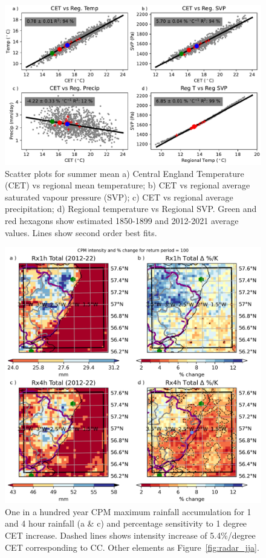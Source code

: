 \documentclass[11pt,a4paper]{article}
\begin{document}
\begin{figure}
	\centering
	\includegraphics[width=\linewidth]{scatter}
	\caption{Scatter plots for summer mean  a)  Central England Temperature (CET) vs  regional mean temperature; b) CET vs regional average saturated vapour pressure (SVP); c) CET vs regional average precipitation; d) Regional temperature vs Regional SVP. Green and red hexagons show estimated 1850-1899 and 2012-2021 average values. Lines show second order best fits.}
	\label{fig:cet_scatter}
\end{figure}

\begin{figure}
	\centering
	\includegraphics[width=1\linewidth]{cpm_intensity_delta}
	\caption{One in a hundred year CPM maximum rainfall accumulation for 1 and 4 hour rainfall (a \& c) and percentage sensitivity to 1 degree CET increase. Dashed lines shows intensity increase of 5.4\%/degree CET corresponding to CC. Other elements as Figure~\ref{fig:radar_jja}.  }
	\label{fig:map_intensity}
\end{figure}
\end{document}
